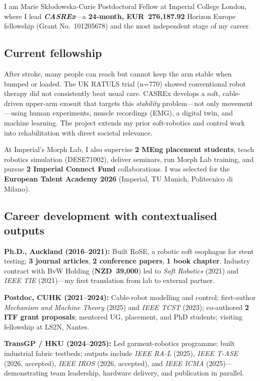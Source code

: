\documentclass[11pt,a4paper]{article}
\newcommand{\btit}[1]{\textbf{\textit{#1}}}
\begin{document}
I am Marie Sk\l{}odowska-Curie Postdoctoral Fellow at Imperial College London, where I lead \btit{CASREx}---a \textbf{24-month, EUR~276,187.92} Horizon Europe fellowship (Grant No.~101205678) and the most independent stage of my career.

\subsection*{Current fellowship}
After stroke, many people can reach but cannot keep the arm stable when bumped or loaded. The UK RATULS trial (n=770) showed conventional robot therapy did not consistently beat usual care. CASREx develops a soft, cable-driven upper-arm exosuit that targets this \emph{stability} problem---not only movement---using human experiments, muscle recordings (EMG), a digital twin, and machine learning. The project extends my prior soft-robotics and control work into rehabilitation with direct societal relevance.

At Imperial's Morph Lab, I also supervise \textbf{2 MEng placement students}, teach robotics simulation (DESE71002), deliver seminars, run Morph Lab training, and pursue \textbf{2 Imperial Connect Fund} collaborations. I was selected for the \textbf{European Talent Academy 2026} (Imperial, TU Munich, Politecnico di Milano).

\subsection*{Career development with contextualised outputs}
\textbf{Ph.D., Auckland (2016--2021):} Built RoSE, a robotic soft esophagus for stent testing; \textbf{3 journal articles}, \textbf{2 conference papers}, \textbf{1 book chapter}. Industry contract with BvW Holding (\textbf{NZD~39,000}) led to \textit{Soft Robotics} (2021) and \textit{IEEE TIE} (2021)---my first translation from lab to external partner.

\textbf{Postdoc, CUHK (2021--2024):} Cable-robot modelling and control; first-author \textit{Mechanism and Machine Theory} (2025) and \textit{IEEE TCST} (2023); co-authored \textbf{2 ITF grant proposals}; mentored UG, placement, and PhD students; visiting fellowship at LS2N, Nantes.

\textbf{TransGP / HKU (2024--2025):} Led garment-robotics programme; built industrial fabric testbeds; outputs include \textit{IEEE RA-L} (2025), \textit{IEEE T-ASE} (2026, accepted), \textit{IEEE IROS} (2026, accepted), and \textit{IEEE ICMA} (2025)---demonstrating team leadership, hardware delivery, and publication in parallel.
\end{document}
